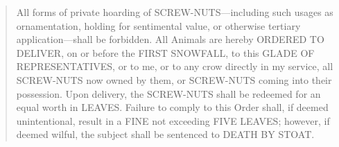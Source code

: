 \begingroup
	\fontsize{10pt}{12pt}\selectfont
		\begin{quote}
			All forms of private hoarding of SCREW-NUTS---including such usages as ornamentation, holding for sentimental value, or otherwise tertiary application---shall be forbidden. All Animals are hereby ORDERED TO DELIVER, on or before the FIRST SNOWFALL, to this GLADE OF REPRESENTATIVES, or to me, or to any crow directly in my service, all SCREW-NUTS now owned by them, or SCREW-NUTS coming into their possession. Upon delivery, the SCREW-NUTS shall be redeemed for an equal worth in LEAVES. Failure to comply to this Order shall, if deemed unintentional, result in a FINE not exceeding FIVE LEAVES; however, if deemed wilful, the subject shall be sentenced to DEATH BY STOAT.
		\end{quote}
\endgroup